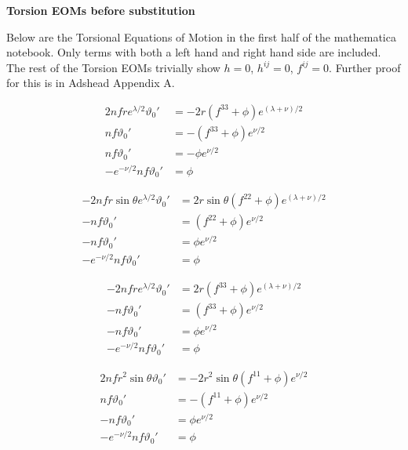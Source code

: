 \documentclass[12pt]{article}
\begin{document}
\begin{center}
  \Large\textbf{Torsion EOMs before substitution} \\
  \large{}
\end{center}

Below are the Torsional Equations of Motion in the first half of the mathematica notebook. Only terms with both a left hand and right hand side are included. The rest of the Torsion EOMs trivially show $h=0$, $h^{ij} = 0$, $f^{ij} = 0$. Further proof for this is in Adshead Appendix A.

\begin{align}
2nf r e^{\lambda/2} \vartheta_0' &= -2r (f^{33} + \phi) e^{(\lambda + \nu)/2} \nonumber \\
nf \vartheta_0' &= -(f^{33} + \phi) e^{\nu/2} \nonumber \\
nf \vartheta_0' &= -\phi e^{\nu/2} \nonumber \\
-e^{-\nu/2} nf \vartheta_0' &= \phi
\end{align}

\begin{align}
-2nf r \sin\theta e^{\lambda/2} \vartheta_0' &= 2r \sin\theta (f^{22} + \phi) e^{(\lambda + \nu)/2} \nonumber \\
-nf \vartheta_0' &= (f^{22} + \phi) e^{\nu/2} \nonumber \\
-nf \vartheta_0' &= \phi e^{\nu/2} \nonumber \\
-e^{-\nu/2} nf \vartheta_0' &= \phi
\end{align}

\begin{align}
-2nf r e^{\lambda/2} \vartheta_0' &= 2r (f^{33} + \phi) e^{(\lambda + \nu)/2} \nonumber \\
-nf \vartheta_0' &= (f^{33} + \phi) e^{\nu/2} \nonumber \\
-nf \vartheta_0' &= \phi e^{\nu/2} \nonumber \\
-e^{-\nu/2} nf \vartheta_0' &= \phi
\end{align}

\begin{align}
2nf r^2 \sin\theta \vartheta_0' &= -2r^2 \sin\theta (f^{11} + \phi) e^{\nu/2} \nonumber \\
nf \vartheta_0' &= - (f^{11} + \phi) e^{\nu/2} \nonumber \\
- nf \vartheta_0' &= \phi e^{\nu/2} \nonumber \\
-e^{-\nu/2} nf \vartheta_0' &= \phi
\end{align}
\end{document}
